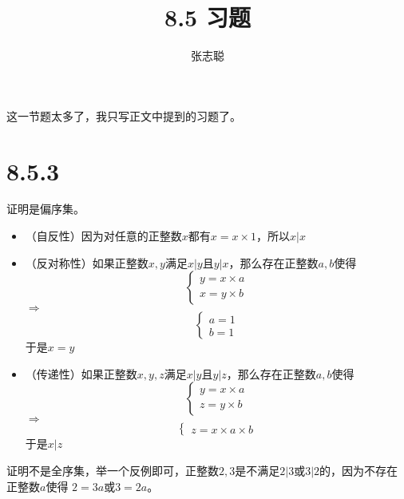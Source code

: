 \documentclass{article}
\begin{document}
\title{8.5 习题}
\author{张志聪}
\maketitle

这一节题太多了，我只写正文中提到的习题了。

\section*{8.5.3}

证明是偏序集。
\begin{itemize}
  \item （自反性）因为对任意的正整数$x$都有$x = x \times 1$，所以$x | x$
  \item （反对称性）如果正整数$x, y$满足$x | y$且$y | x$，那么存在正整数$a,b$使得
        \begin{equation*}
          \begin{cases*}
            y = x \times a \\
            x = y \times b
          \end{cases*}
        \end{equation*}
        $\Rightarrow$
        \begin{equation*}
          \begin{cases*}
            a = 1 \\
            b = 1
          \end{cases*}
        \end{equation*}
        于是$x = y$
  \item （传递性）如果正整数$x, y, z$满足$x | y$且$y | z$，那么存在正整数$a,b$使得
        \begin{equation*}
          \begin{cases*}
            y = x \times a \\
            z = y \times b
          \end{cases*}
        \end{equation*}
        $\Rightarrow$
        \begin{equation*}
          \begin{cases*}
            z = x \times a \times b
          \end{cases*}
        \end{equation*}
        于是$x | z$
\end{itemize}

证明不是全序集，举一个反例即可，正整数$2,3$是不满足$2 | 3$或$3 | 2$的，因为不存在正整数$a$使得
$2 = 3a$或$3 = 2a$。
\end{document}
